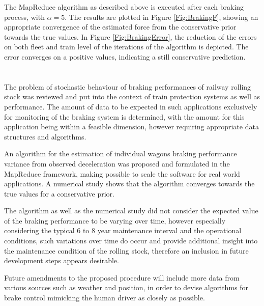 \documentclass[a4paper, 12pt]{scrartcl}
\begin{document}
The MapReduce algorithm as described above is executed after each braking process, with $\alpha = 5$. The results are plotted in Figure \ref{Fig:BrakingF}, showing an appropriate convergence of the estimated force from the conservative prior  towards the true values. In Figure \ref{Fig:BrakingError}, the reduction of the errors on both fleet and train level of the iterations of the algorithm is depicted. The error converges on a positive values, indicating a still conservative prediction.

\section{}
The problem of stochastic behaviour of braking performances of railway rolling stock was reviewed and put into the context of train protection systems as well as performance. The amount of data to be expected in such applications exclusively for monitoring of the braking system is determined, with the amount for this application being within a feasible dimension, however requiring appropriate data structures and algorithms.

An algorithm for the estimation of individual wagons braking performance variance from observed deceleration was proposed and formulated in the MapReduce framework, making possible to scale the software for real world applications. A numerical study shows that the algorithm converges towards the true values for a conservative prior.

The algorithm as well as the numerical study did not consider the expected value of the braking performance to be varying over time, however especially considering the typical 6 to 8 year maintenance interval and the operational conditions, such variations over time do occur and provide additional insight into the maintenance condition of the rolling stock, therefore an inclusion in future development steps appears desirable.

Future amendments to the proposed procedure will include more data from various sources such as weather and position, in order to devise algorithms for brake control mimicking the human driver as closely as possible.




\end{document}
